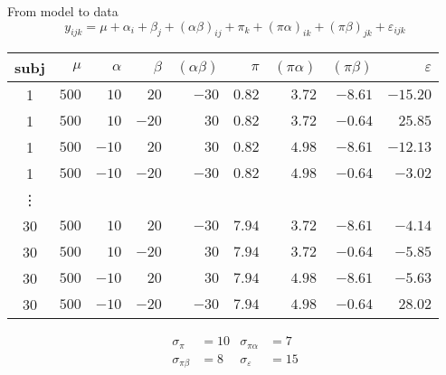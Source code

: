 \documentclass[aspectratio=169]{beamer}
\begin{document}
\begin{frame}{From model to data}
 \[
   y_{ijk} = \mu + \alpha_i + \beta_j + (\alpha\beta)_{ij} + \pi_k +
   (\pi\alpha)_{ik} + (\pi\beta)_{jk} + \varepsilon_{ijk}
 \]

\centering
  {\small
  \begin{tabular}{crrrrrrrr}
    \hline
    subj & $\mu$ & $\alpha$ & $\beta$ & $(\alpha\beta)$ & $\pi$ & $(\pi\alpha)$ &
    $(\pi\beta)$ & $\varepsilon$ \\
    \hline
    1 & $500$ & $ 10$ & $ 20$ & $-30$ & $0.82$ & $3.72$ & $-8.61$ & $-15.20$\\
    1 & $500$ & $ 10$ & $-20$ & $ 30$ & $0.82$ & $3.72$ & $-0.64$ & $ 25.85$\\
    1 & $500$ & $-10$ & $ 20$ & $ 30$ & $0.82$ & $4.98$ & $-8.61$ & $-12.13$\\
    1 & $500$ & $-10$ & $-20$ & $-30$ & $0.82$ & $4.98$ & $-0.64$ & $ -3.02$\\
    \vdots & & & & & & & & \\
    30 & $500$ & $ 10$ & $ 20$ & $-30$ & $7.94$ & $3.72$ & $-8.61$ & $-4.14$\\
    30 & $500$ & $ 10$ & $-20$ & $ 30$ & $7.94$ & $3.72$ & $-0.64$ & $-5.85$\\
    30 & $500$ & $-10$ & $ 20$ & $ 30$ & $7.94$ & $4.98$ & $-8.61$ & $-5.63$\\
    30 & $500$ & $-10$ & $-20$ & $-30$ & $7.94$ & $4.98$ & $-0.64$ & $28.02$\\
    \hline
  \end{tabular}
  }
  \begin{align*}
    \sigma_{\pi}      & = 10 & \sigma_{\pi\alpha}   & =  7 \\
    \sigma_{\pi\beta} & =  8 & \sigma_{\varepsilon} & = 15
  \end{align*}
\end{frame}
\end{document}
